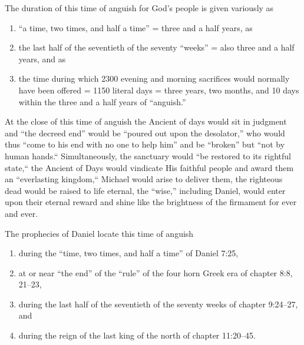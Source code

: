 The duration of this time of anguish for God's people is given variously as
\begin{enumerate}
    \item ``a time, two times, and half a time'' = three and a half years,
         as
    \item the last half of the seventieth of the seventy ``weeks'' = also three and a
        half years, and as 
    \item  the time during which 2300 evening and morning
sacrifices would normally have been offered = 1150 literal days = three
        years, two months, and 10 days within 
        the three and a half years of ``anguish.''
\end{enumerate}

At the close of this time of anguish the Ancient of days would sit in
judgment and ``the decreed end'' would be ``poured out upon the desolator,'' who
would thus ``come to his end with no one to help him'' and be ``broken'' but
``not by human hands.``
Simultaneously, the sanctuary would ``be restored to
its rightful state,`` the Ancient of Days would vindicate His faithful people
and award them an ``everlasting kingdom,`` Michael would arise to deliver
them, the righteous dead would be raised to life eternal, the ``wise,''
including Daniel, would enter upon their eternal reward and shine like the
brightness of the firmament for ever and ever.

The prophecies of Daniel locate this time of anguish 
\begin{enumerate}
    \item during the ``time,
two times, and half a time'' of Daniel 7:25, 
    \item at or near ``the end'' of the
``rule'' of the four horn Greek era of chapter 8:8, 21--23, 
    \item during the last
half of the seventieth of the seventy weeks of chapter 9:24--27, and 
    \item during the reign of the last king of the north of chapter 11:20--45. 
\end{enumerate}

